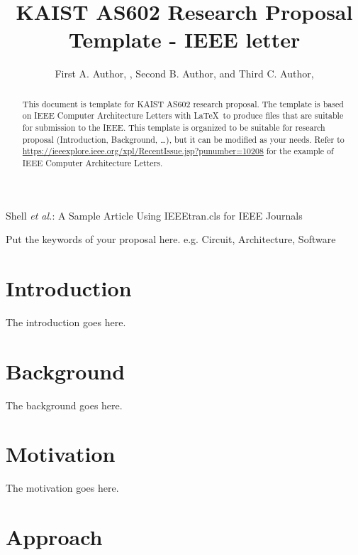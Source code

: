 \documentclass[journal,9pt]{IEEEtran}
\begin{document}
\title{KAIST AS602 Research Proposal Template - IEEE letter}

\author{First A. Author, , Second B. Author, and Third C. Author, 
}

%
{Shell \MakeLowercase{\textit{et al.}}: A Sample Article Using IEEEtran.cls for IEEE Journals}


\maketitle
\begin{abstract}
  This document is template for KAIST AS602 research proposal.
  The template is based on IEEE Computer Architecture Letters with \LaTeX \ to produce files that are suitable for submission to the IEEE.
  This template is organized to be suitable for research proposal (Introduction, Background, \dots), but it can be modified as your needs.
  Refer to \url{https://ieeexplore.ieee.org/xpl/RecentIssue.jsp?punumber=10208} for the example of IEEE Computer Architecture Letters.
\end{abstract}

\begin{IEEEkeywords}
  Put the keywords of your proposal here. e.g. Circuit, Architecture, Software
\end{IEEEkeywords}

\section{Introduction}

The introduction goes here.

\section{Background}

The background goes here.

\section{Motivation}

The motivation goes here.

\section{Approach}
\end{document}

